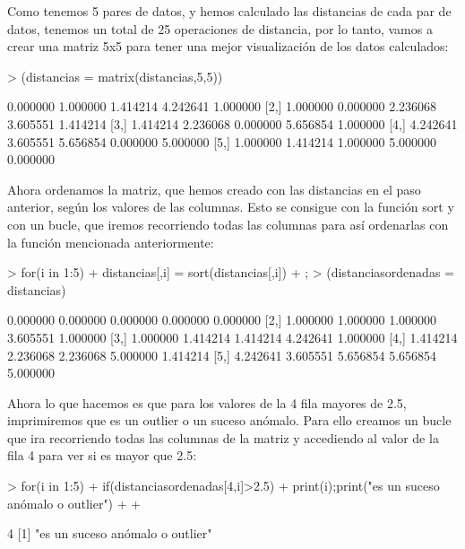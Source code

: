 \documentclass [a4paper] {article}
\begin{document}
Como tenemos 5 pares de datos, y hemos calculado las distancias de cada par de datos, tenemos un total
de 25 operaciones de distancia, por lo tanto, vamos a crear una matriz 5x5 para tener una mejor
visualización de los datos calculados:

\begin{Schunk}
\begin{Sinput}
> (distancias = matrix(distancias,5,5))
\end{Sinput}
\begin{Soutput}
         [,1]     [,2]     [,3]     [,4]     [,5]
[1,] 0.000000 1.000000 1.414214 4.242641 1.000000
[2,] 1.000000 0.000000 2.236068 3.605551 1.414214
[3,] 1.414214 2.236068 0.000000 5.656854 1.000000
[4,] 4.242641 3.605551 5.656854 0.000000 5.000000
[5,] 1.000000 1.414214 1.000000 5.000000 0.000000
\end{Soutput}
\end{Schunk}

Ahora ordenamos la matriz, que hemos creado con las distancias en el paso anterior, según los valores
de las columnas. Esto se consigue con la función sort y con un bucle, que iremos recorriendo todas
las columnas para así ordenarlas con la función mencionada anteriormente:

\begin{Schunk}
\begin{Sinput}
> for(i in 1:5){
+ 	distancias[,i] = sort(distancias[,i])
+ };
> (distanciasordenadas = distancias)
\end{Sinput}
\begin{Soutput}
         [,1]     [,2]     [,3]     [,4]     [,5]
[1,] 0.000000 0.000000 0.000000 0.000000 0.000000
[2,] 1.000000 1.000000 1.000000 3.605551 1.000000
[3,] 1.000000 1.414214 1.414214 4.242641 1.000000
[4,] 1.414214 2.236068 2.236068 5.000000 1.414214
[5,] 4.242641 3.605551 5.656854 5.656854 5.000000
\end{Soutput}
\end{Schunk}

Ahora lo que hacemos es que para los valores de la 4 fila mayores de 2.5, imprimiremos que es un outlier
o un suceso anómalo. Para ello creamos un bucle que ira recorriendo todas las columnas de la matriz
y accediendo al valor de la fila 4 para ver si es mayor que 2.5:

\begin{Schunk}
\begin{Sinput}
> for(i in 1:5){
+ 	if(distanciasordenadas[4,i]>2.5){
+ 		print(i);print("es un suceso anómalo o outlier")
+ 	}
+ }
\end{Sinput}
\begin{Soutput}
[1] 4
[1] "es un suceso anómalo o outlier"
\end{Soutput}
\end{Schunk}
\end{document}
